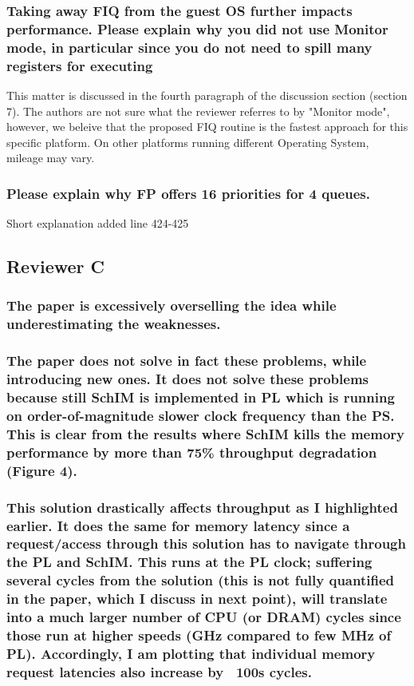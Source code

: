         \subsubsection{Taking away FIQ from the guest OS further impacts performance. Please explain why you did not use Monitor mode, in particular since you do not need to spill many registers for executing}
            This matter is discussed in the fourth paragraph of the discussion section (section 7).
            The authors are not sure what the reviewer referres to by "Monitor mode", however, we beleive that the proposed FIQ routine is the fastest approach for this specific platform. On other platforms running different Operating System, mileage may vary. 

        \subsubsection{Please explain why FP offers 16 priorities for 4 queues.}
            Short explanation added line 424-425

    \subsection{Reviewer C}
        \subsubsection{The paper is excessively overselling the idea while underestimating the weaknesses.}


        \subsubsection{The paper does not solve in fact these problems, while introducing new ones. It does not solve these problems because still SchIM is implemented in PL which is running on order-of-magnitude slower clock frequency than the PS. This is clear from the results where SchIM kills the memory performance by more than 75\% throughput degradation (Figure 4).}


        \subsubsection{This solution drastically affects throughput as I highlighted earlier. It does the same for memory latency since a request/access through this solution has to navigate through the PL and SchIM. This runs at the PL clock; suffering several cycles from the solution (this is not fully quantified in the paper, which I discuss in next point),  will translate into a much larger number of CPU (or DRAM) cycles since those run at higher speeds (GHz compared to few MHz of PL). Accordingly, I am plotting that individual memory request latencies also increase by ~100s cycles.}


